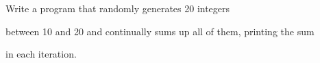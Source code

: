 Write a program that randomly generates 20 integers

between 10 and 20 and continually sums up all of them, printing the sum

in each iteration.

